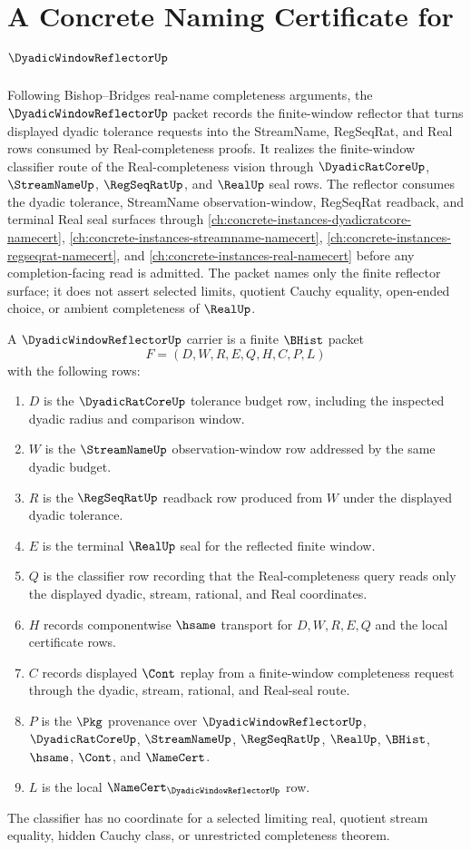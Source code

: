 \chapter{A Concrete Naming Certificate for $\DyadicWindowReflectorUp$}
\label{ch:concrete-instances-dyadic-window-reflector-namecert}

Following Bishop--Bridges real-name completeness arguments, the $\DyadicWindowReflectorUp$ packet records the finite-window reflector that turns displayed dyadic tolerance requests into the StreamName, RegSeqRat, and Real rows consumed by Real-completeness proofs. It realizes the finite-window classifier route of the Real-completeness vision through $\DyadicRatCoreUp$, $\StreamNameUp$, $\RegSeqRatUp$, and $\RealUp$ seal rows. The reflector consumes the dyadic tolerance, StreamName observation-window, RegSeqRat readback, and terminal Real seal surfaces through \autoref{ch:concrete-instances-dyadicratcore-namecert}, \autoref{ch:concrete-instances-streamname-namecert}, \autoref{ch:concrete-instances-regseqrat-namecert}, and \autoref{ch:concrete-instances-real-namecert} before any completion-facing read is admitted. The packet names only the finite reflector surface; it does not assert selected limits, quotient Cauchy equality, open-ended choice, or ambient completeness of $\RealUp$.

\begin{definition}
\label{def:dyadic-window-reflector-carrier}
A $\DyadicWindowReflectorUp$ carrier is a finite $\BHist$ packet
$$
F=(D,W,R,E,Q,H,C,P,L)
$$
with the following rows:
\begin{enumerate}
\item $D$ is the $\DyadicRatCoreUp$ tolerance budget row, including the inspected dyadic radius and comparison window.
\item $W$ is the $\StreamNameUp$ observation-window row addressed by the same dyadic budget.
\item $R$ is the $\RegSeqRatUp$ readback row produced from $W$ under the displayed dyadic tolerance.
\item $E$ is the terminal $\RealUp$ seal for the reflected finite window.
\item $Q$ is the classifier row recording that the Real-completeness query reads only the displayed dyadic, stream, rational, and Real coordinates.
\item $H$ records componentwise $\hsame$ transport for $D,W,R,E,Q$ and the local certificate rows.
\item $C$ records displayed $\Cont$ replay from a finite-window completeness request through the dyadic, stream, rational, and Real-seal route.
\item $P$ is the $\Pkg$ provenance over $\DyadicWindowReflectorUp$, $\DyadicRatCoreUp$, $\StreamNameUp$, $\RegSeqRatUp$, $\RealUp$, $\BHist$, $\hsame$, $\Cont$, and $\NameCert$.
\item $L$ is the local $\NameCert_{\DyadicWindowReflectorUp}$ row.
\end{enumerate}
The classifier has no coordinate for a selected limiting real, quotient stream equality, hidden Cauchy class, or unrestricted completeness theorem.
\end{definition}

